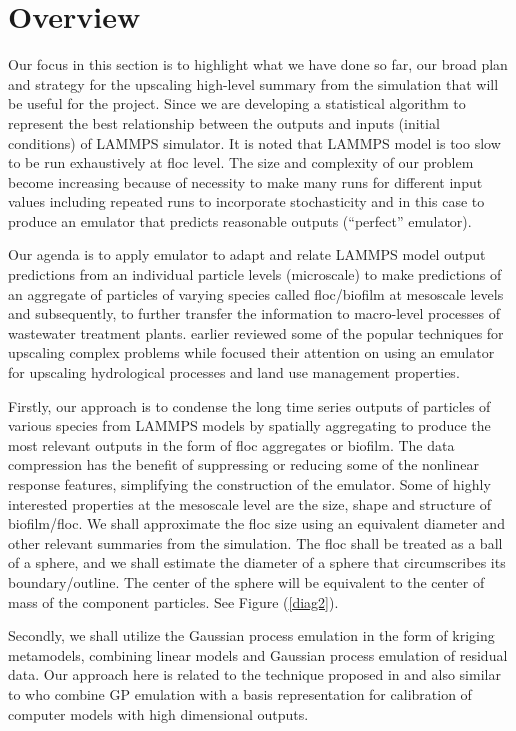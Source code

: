 \documentclass[12pt,titlepage]{report}
\theoremstyle{definition}
\theoremstyle{remark}
\begin{document}
\section{Overview}
Our focus in this section is to highlight what we have done so far, our broad plan and strategy for the upscaling high-level summary from the simulation that will be useful for the project. Since we are developing a statistical algorithm to represent the best relationship between the outputs and inputs (initial conditions) of LAMMPS simulator. It is noted that LAMMPS model is too slow to be run exhaustively at floc level. 
The size and complexity of our problem become increasing because of necessity to make many runs for different input values including repeated runs to incorporate stochasticity and in this case to produce an emulator that predicts reasonable outputs (“perfect” emulator). %

Our agenda is to apply emulator to adapt and relate LAMMPS model output predictions from an individual particle levels (microscale) to make predictions of an aggregate of particles of varying species called floc/biofilm at mesoscale levels and subsequently, to further transfer the information to macro-level processes of wastewater treatment plants. \citet{l9} earlier reviewed some of the popular techniques for upscaling complex problems while \citet{l4,l8} focused their attention on using an emulator for upscaling hydrological processes and land use management properties.

Firstly, our approach is to condense the long time series outputs of particles of various species from LAMMPS models by spatially aggregating to produce the most relevant outputs in the form of floc aggregates or biofilm. The data compression has the benefit of suppressing or reducing some of the nonlinear response features, simplifying the construction of the emulator. 
Some of highly interested properties at the mesoscale level are the size, shape and structure of biofilm/floc. We shall approximate the floc size using an equivalent diameter and other relevant summaries from the simulation. The floc shall be treated as a ball of a sphere, and we shall estimate the diameter of a sphere that circumscribes its boundary/outline. The center of the sphere will be equivalent to the center of mass of the component particles. See Figure (\ref{diag2}).

Secondly, we shall utilize the Gaussian process emulation in the form of kriging metamodels, combining linear models and Gaussian process emulation of residual data. Our approach here is related to the technique proposed in \citet{l5,l7} and also similar to \citet{l6} who combine GP emulation with a basis representation for calibration of computer models with high dimensional outputs.
\end{document}
